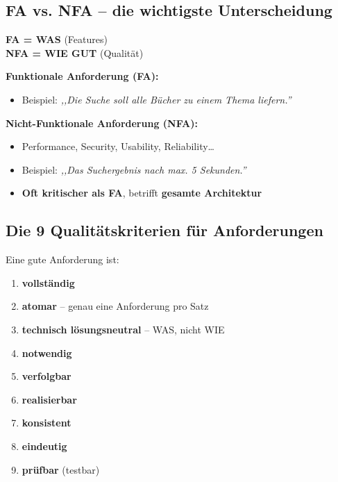 \documentclass[11pt,a4paper]{article}
\begin{document}
\subsection{FA vs. NFA -- die wichtigste Unterscheidung}

\begin{tldr}
\textbf{FA = WAS} (Features)\\
\textbf{NFA = WIE GUT} (Qualität)
\end{tldr}

\begin{keyfacts}
\textbf{Funktionale Anforderung (FA):}
\begin{itemize}
  \item Beispiel: \emph{,,Die Suche soll alle Bücher zu einem Thema liefern.''}
\end{itemize}

\textbf{Nicht-Funktionale Anforderung (NFA):}
\begin{itemize}
  \item Performance, Security, Usability, Reliability\dots
  \item Beispiel: \emph{,,Das Suchergebnis nach max. 5 Sekunden.''}
  \item \textbf{Oft kritischer als FA}, betrifft \textbf{gesamte Architektur}
\end{itemize}
\end{keyfacts}

\subsection{Die 9 Qualitätskriterien für Anforderungen}

\begin{keyfacts}
Eine gute Anforderung ist:
\begin{enumerate}
  \item \textbf{vollständig}
  \item \textbf{atomar} -- genau eine Anforderung pro Satz
  \item \textbf{technisch lösungsneutral} -- WAS, nicht WIE
  \item \textbf{notwendig}
  \item \textbf{verfolgbar}
  \item \textbf{realisierbar}
  \item \textbf{konsistent}
  \item \textbf{eindeutig}
  \item \textbf{prüfbar} (testbar)
\end{enumerate}
\end{keyfacts}
\end{document}

